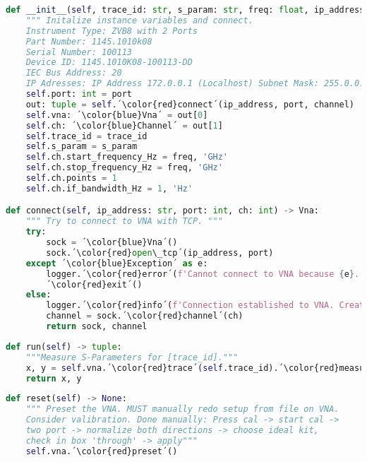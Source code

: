 \begin{lstlisting}[language=Python, caption=Method for initialisation of VNA settings including creating VNA trace.]
def __init__(self, trace_id: str, s_param: str, freq: float, ip_address = '172.0.0.1', port: int = 5025, channel = 1) -> None:
    """ Initalize instance variables and connect.
    Instrument Type: ZVB8 with 2 Ports
    Part Number: 1145.1010k08
    Serial Number: 100113
    Device ID: 1145.1010K08-100113-DD
    IEC Bus Address: 20
    IP Adresses: IP Address 172.0.0.1 (Localhost) Subnet Mask: 255.0.0.0 """
    self.port: int = port
    out: tuple = self.´\color{red}connect´(ip_address, port, channel)
    self.vna: ´\color{blue}Vna´ = out[0]
    self.ch: ´\color{blue}Channel´ = out[1]
    self.trace_id = trace_id
    self.s_param = s_param
    self.ch.start_frequency_Hz = freq, 'GHz'
    self.ch.stop_frequency_Hz = freq, 'GHz'
    self.ch.points = 1
    self.ch.if_bandwidth_Hz = 1, 'Hz'

def connect(self, ip_address: str, port: int, ch: int) -> Vna:
    """ Try to connect to VNA with TCP. """
    try:
        sock = ´\color{blue}Vna´()
        sock.´\color{red}open\_tcp´(ip_address, port)
    except ´\color{blue}Exception´ as e:
        logger.´\color{red}error´(f'Cannot connect to VNA because {e}.')
        ´\color{red}exit´()
    else:
        logger.´\color{red}info´(f'Connection established to VNA. Creating channel {ch}.')
        channel = sock.´\color{red}channel´(ch)
        return sock, channel
\end{lstlisting}

\begin{lstlisting}[language=Python, caption=Method for getting measurements from VNA.]
def run(self) -> tuple:
    """Measure S-Parameters for [trace_id]."""
    x, y = self.vna.´\color{red}trace´(self.trace_id).´\color{red}measure\_formatted\_data´()
    return x, y
\end{lstlisting}

\begin{lstlisting}[language=Python, caption=Method for resetting the VNA completely.]
def reset(self) -> None:
    """ Preset the VNA. MUST manually redo setup from file on VNA. 
    Consider valibration. Done manually: Press cal -> start cal -> 
    two port -> normalize both directions -> choose ideal kit, 
    check in box 'through' -> apply"""
    self.vna.´\color{red}preset´()
\end{lstlisting}

